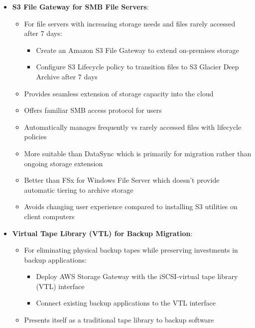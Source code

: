 \documentclass[11pt,a4paper]{report}
\begin{document}
\begin{itemize}
\begin{itemize}
  \item Provides user authentication and file permissions using existing AD infrastructure
  \item Primarily used for secure connection between on-premises environments and AWS Cloud storage
  \item Not recommended for Microsoft SharePoint workloads requiring specialized Windows file storage
\end{itemize}
  \item \textbf{S3 File Gateway for SMB File Servers}:
\begin{itemize}
  \item For file servers with increasing storage needs and files rarely accessed after 7 days:
\begin{itemize}
  \item Create an Amazon S3 File Gateway to extend on-premises storage
  \item Configure S3 Lifecycle policy to transition files to S3 Glacier Deep Archive after 7 days
\end{itemize}
  \item Provides seamless extension of storage capacity into the cloud
  \item Offers familiar SMB access protocol for users
  \item Automatically manages frequently vs rarely accessed files with lifecycle policies
  \item More suitable than DataSync which is primarily for migration rather than ongoing storage extension
  \item Better than FSx for Windows File Server which doesn't provide automatic tiering to archive storage
  \item Avoids changing user experience compared to installing S3 utilities on client computers
\end{itemize}
  \item \textbf{Virtual Tape Library (VTL) for Backup Migration}:
\begin{itemize}
  \item For eliminating physical backup tapes while preserving investments in backup applications:
\begin{itemize}
  \item Deploy AWS Storage Gateway with the iSCSI-virtual tape library (VTL) interface
  \item Connect existing backup applications to the VTL interface
\end{itemize}
  \item Presents itself as a traditional tape library to backup software

\end{itemize}
\end{itemize}
\end{document}
